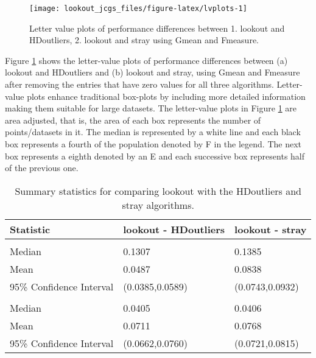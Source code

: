 \documentclass[12pt]{article}
\theoremstyle{definition}
\theoremstyle{definition}
\theoremstyle{definition}
\theoremstyle{remark}
\begin{document}
\begin{figure}
\texttt{[image: lookout\_jcgs\_files/figure-latex/lvplots-1]} \caption{Letter value plots of performance differences between 1. lookout and HDoutliers, 2. lookout and stray using Gmean and Fmeasure.}\label{fig:lvplots}
\end{figure}

Figure \ref{fig:lvplots} shows the letter-value plots \citep{lvplots} of performance differences between
(a) lookout and HDoutliers and
(b) lookout and stray,
using Gmean and Fmeasure after removing the entries that have zero values for all three algorithms. Letter-value plots enhance traditional box-plots by including more detailed information making them suitable for large datasets. The letter-value plots in Figure \ref{fig:lvplots} are area adjusted, that is, the area of each box represents the number of points/datasets in it. The median is represented by a white line and each black box represents a fourth of the population denoted by F in the legend. The next box represents a eighth denoted by an E and each successive box represents half of the previous one.

\begin{table}

\caption{\label{tab:table}Summary statistics for comparing lookout with the HDoutliers and stray algorithms.}
\centering
\begin{tabular}[t]{lll}
\toprule
Statistic & lookout - HDoutliers & lookout - stray\\
\midrule
\addlinespace[0.3em]
\multicolumn{3}{l}{\textbf{Fmeasure}}\\
\hspace{1em}Median & 0.1307 & 0.1385\\
\hspace{1em}Mean & 0.0487 & 0.0838\\
\hspace{1em}95\% Confidence Interval & (0.0385,0.0589) & (0.0743,0.0932)\\
\addlinespace[0.3em]
\multicolumn{3}{l}{\textbf{Gmean}}\\
\hspace{1em}Median & 0.0405 & 0.0406\\
\hspace{1em}Mean & 0.0711 & 0.0768\\
\hspace{1em}95\% Confidence Interval & (0.0662,0.0760) & (0.0721,0.0815)\\
\bottomrule
\end{tabular}
\end{table}
\end{document}
